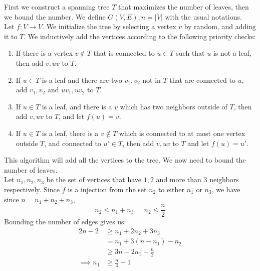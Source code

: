 \begin{solution}[dgrozev]
    First we construct a spanning tree $T$ that maximizes the number of leaves,
    then we bound the number. We define $G(V, E), n = \left|V\right| $ with
    the usual notations.\\

    Let $f: V \to V$. We initialize the tree by selecting a vertex $v$ by
    random, and adding it to $T$. We inductively add the vertices according to
    the following priority checks:

    \begin{enumerate}[label=\textbf{\boxed{\arabic*.}}, itemsep=5pt]
        \item If there is a vertex $v\not \in T$ that is connected to $u\in T$
            such that $u$ is not a leaf, then add $v, uv$ to $T$.
        \item If $u\in T$ is a leaf and there are two $v_1, v_2$ not in $T$
            that are connected to $u$, add $v_1, v_2$ and $uv_1, uv_2$ to $T$.
        \item If $u\in T$ is a leaf, and there is a $v$ which has two
            neighbors outside of $T$, then add $v, uv$ to $T$, and let $f(u)=v$.
        \item If $u\in T$ is a leaf, there is a $v \not \in T$ which is
            connected to at most one vertex outside $T$, and connected to
            $u'\in T$, then add $v, uv$ to $T$ and let $f(u) = u'$.
    \end{enumerate}
    This algorithm will add all the vertices to the tree. We now need to bound
    the number of leaves.\\

    Let $n_1, n_2, n_3$ be the set of vertices that have $1, 2$ and more than
    $3$ neighbors respectively. Since $f$ is a injection from the set $n_2$ to
    either $n_1$ or $n_3$, we have since $n = n_1+n_2+n_3$,
    \[n_2 \le n_1 + n_3,\quad n_2 \le \frac{n}{2}\]
    Bounding the number of edges gives us:
    \[\begin{aligned}
        2n-2 &\ge n_1 + 2n_2 + 3n_3\\
             &= n_1 + 3(n-n_1) - n_2\\
             &\ge 3n - 2n_1 - \frac{n}{2}\\
        \implies n_1 &\ge \frac{n}{4}+1
    \end{aligned}\]
\end{solution}


